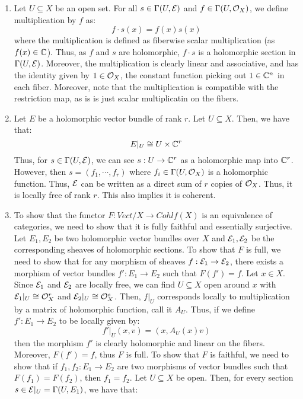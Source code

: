 \documentclass[12pt]{article}
\begin{document}
\begin{solution}
    \bbni 
    \begin{enumerate}
        \item Let $U \subseteq X$ be an open set. For all $s \in \Gamma(U, \mathcal{E})$ and $f \in \Gamma(U, \mathcal{O}_X)$, we define multiplication by $f$ as: 
        \[ f\cdot s(x) = f(x)s(x)\]
        where the multiplication is defined as fiberwise scalar multiplication (as $f(x) \in \mathbb C$). Thus, as $f$ and $s$ are holomorphic, $f\cdot s$ is a holomorphic section in $\Gamma(U, \mathcal{E})$. Moreover, the multiplication is clearly linear and associative, and has the identity given by $1 \in \mathcal{O}_X$, the constant function picking out $1 \in \mathbb C^n$ in each fiber. Moreover, note that the multiplication is compatible with the restriction map, as is is just scalar multiplicatin on the fibers.
        \item Let $E$ be a holomorphic vector bundle of rank $r$. Let $U \subseteq X$. Then, we have that: 
        \[  E|_U \cong U \times \mathbb C^r\] 
        Thus, for $s \in \Gamma(U, \mathcal{E})$, we can see $s: U \to \mathbb C^r$ as a holomorphic map into $\mathbb C^r$. However, then $s = (f_1, \cdots, f_r)$ where $f_i \in \Gamma(U, \mathcal{O}_X)$ is a holomorphic function. Thus, $\mathcal{E}$ can be written as a direct sum of $r$ copies of $\mathcal{O}_X$. Thus, it is locally free of rank $r$. This also implies it is coherent.
        \item To show that the functor $F: \mathit{Vect}/X \to \mathit{Cohlf}(X)$ is an equivalence of categories, we need to show that it is fully faithful and essentially surjective. \bbni 
        Let $E_1, E_2$ be two holomorphic vector bundles over $X$ and $\mathcal{E}_1, \mathcal{E}_2$ be the corresponding sheaves of holomorphic sections. \bbni
        To show that $F$ is full, we need to show that for any morphism of sheaves $f: \mathcal{E}_1 \to \mathcal{E}_2$, there exists a morphism of vector bundles $f': E_1 \to E_2$ such that $F(f') = f$. Let $x \in X$. Since $\mathcal{E}_1$ and $\mathcal{E}_2$ are locally free, we can find $U \subseteq X$ open around $x$ with $\mathcal{E}_1|_U \cong \mathcal{O}_X^r$ and $\mathcal{E}_2|_U \cong \mathcal{O}_X^s$. Then, $f|_U$ corresponds locally to multiplication by a matrix of holomorphic function, call it $A_U$. Thus, if we define $f': E_1 \to E_2$ to be locally given by: 
        \[ f'|_U(x, v) = (x, A_U(x) v)\]
        then the morphism $f'$ is clearly holomorphic and linear on the fibers. Moreover, $F(f') = f$, thus $F$ is full. \bbni 
        To show that $F$ is faithful, we need to show that if $f_1, f_2: E_1 \to E_2$ are two morphisms of vector bundles such that $F(f_1) = F(f_2)$, then $f_1 = f_2$. Let $U \subseteq X$ be open. Then, for every section $s \in \mathcal{E}|_U = \Gamma(U, E_1)$, we have that: 

\end{enumerate}
\end{solution}
\end{document}
